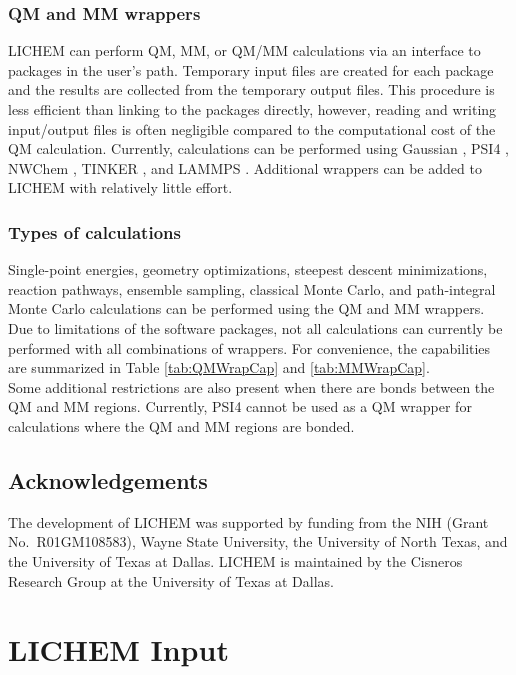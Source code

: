 \documentclass[12pt]{report}
\begin{document}
\subsection{QM and MM wrappers}

LICHEM can perform QM, MM, or QM/MM calculations via an interface to packages
in the user's path.
Temporary input files are created for each package and the results are
collected from the temporary output files.
This procedure is less efficient than linking to the packages directly,
however, reading and writing input/output files is often negligible compared
to the computational cost of the QM calculation.
Currently, calculations can be performed using Gaussian \cite{Frisch2009},
PSI4 \cite{Turney2012},
NWChem \cite{NWChem2010},
TINKER \cite{Ponder2015},
and LAMMPS \cite{Plimpton1995}.
Additional wrappers can be added to LICHEM with relatively little effort.

\subsection{Types of calculations}

Single-point energies, geometry optimizations, steepest descent minimizations,
reaction pathways, ensemble sampling, classical Monte Carlo, and
path-integral Monte Carlo calculations can be performed using the QM and MM
wrappers.
Due to limitations of the software packages, not all calculations can
currently be performed with all combinations of wrappers.
For convenience, the capabilities are summarized in Table \ref{tab:QMWrapCap}
and \ref{tab:MMWrapCap}. \\

Some additional restrictions are also present when there are bonds between
the QM and MM regions.
Currently, PSI4 cannot be used as a QM wrapper for calculations where the QM
and MM regions are bonded.

\section{Acknowledgements}

The development of LICHEM was supported by funding from the NIH (Grant No.\
R01GM108583), Wayne State University, the University of North Texas,
and the University of Texas at Dallas.
LICHEM is maintained by the Cisneros Research Group at the University of
Texas at Dallas.

\chapter{LICHEM Input}
\end{document}
